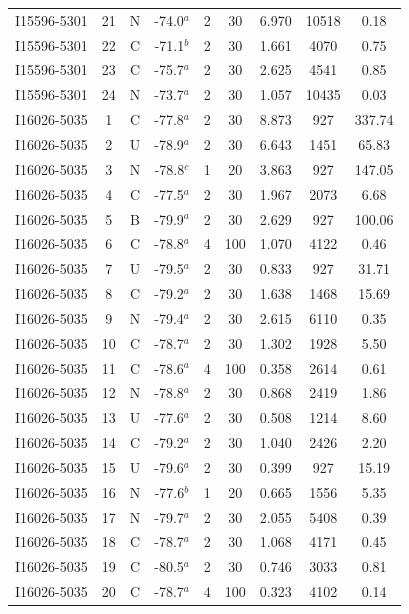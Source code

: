\begin{table}
\begin{tabular}{ccccccccc}
I15596-5301 & 21 & N & -74.0$^{a}$ & 2 & 30 & 6.970 & 10518 & 0.18 \\
I15596-5301 & 22 & C & -71.1$^{b}$ & 2 & 30 & 1.661 & 4070 & 0.75 \\
I15596-5301 & 23 & C & -75.7$^{a}$ & 2 & 30 & 2.625 & 4541 & 0.85 \\
I15596-5301 & 24 & N & -73.7$^{a}$ & 2 & 30 & 1.057 & 10435 & 0.03 \\
I16026-5035 & 1 & C & -77.8$^{a}$ & 2 & 30 & 8.873 & 927 & 337.74 \\
I16026-5035 & 2 & U & -78.9$^{a}$ & 2 & 30 & 6.643 & 1451 & 65.83 \\
I16026-5035 & 3 & N & -78.8$^{c}$ & 1 & 20 & 3.863 & 927 & 147.05 \\
I16026-5035 & 4 & C & -77.5$^{a}$ & 2 & 30 & 1.967 & 2073 & 6.68 \\
I16026-5035 & 5 & B & -79.9$^{a}$ & 2 & 30 & 2.629 & 927 & 100.06 \\
I16026-5035 & 6 & C & -78.8$^{a}$ & 4 & 100 & 1.070 & 4122 & 0.46 \\
I16026-5035 & 7 & U & -79.5$^{a}$ & 2 & 30 & 0.833 & 927 & 31.71 \\
I16026-5035 & 8 & C & -79.2$^{a}$ & 2 & 30 & 1.638 & 1468 & 15.69 \\
I16026-5035 & 9 & N & -79.4$^{a}$ & 2 & 30 & 2.615 & 6110 & 0.35 \\
I16026-5035 & 10 & C & -78.7$^{a}$ & 2 & 30 & 1.302 & 1928 & 5.50 \\
I16026-5035 & 11 & C & -78.6$^{a}$ & 4 & 100 & 0.358 & 2614 & 0.61 \\
I16026-5035 & 12 & N & -78.8$^{a}$ & 2 & 30 & 0.868 & 2419 & 1.86 \\
I16026-5035 & 13 & U & -77.6$^{a}$ & 2 & 30 & 0.508 & 1214 & 8.60 \\
I16026-5035 & 14 & C & -79.2$^{a}$ & 2 & 30 & 1.040 & 2426 & 2.20 \\
I16026-5035 & 15 & U & -79.6$^{a}$ & 2 & 30 & 0.399 & 927 & 15.19 \\
I16026-5035 & 16 & N & -77.6$^{b}$ & 1 & 20 & 0.665 & 1556 & 5.35 \\
I16026-5035 & 17 & N & -79.7$^{a}$ & 2 & 30 & 2.055 & 5408 & 0.39 \\
I16026-5035 & 18 & C & -78.7$^{a}$ & 2 & 30 & 1.068 & 4171 & 0.45 \\
I16026-5035 & 19 & C & -80.5$^{a}$ & 2 & 30 & 0.746 & 3033 & 0.81 \\
I16026-5035 & 20 & C & -78.7$^{a}$ & 4 & 100 & 0.323 & 4102 & 0.14 \\

\end{tabular}
\end{table}
